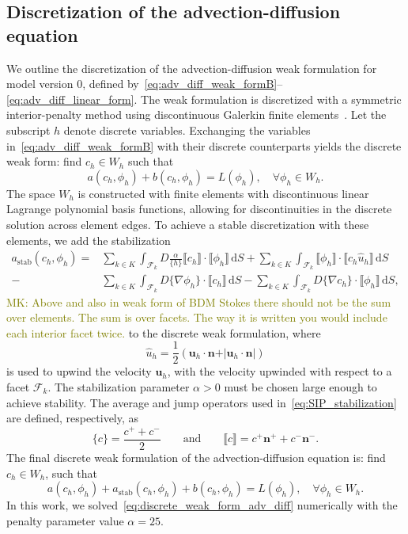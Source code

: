 \documentclass[fleqn]{wlscirep}
\newcommand{\intF}[1]{\int_{\mathcal{F}_k}#1 \, \mathrm dS}
\newcommand{\avg}[1]{\{#1\}}
\newcommand{\jump}[1]{\llbracket#1\rrbracket}
\newcommand{\nn}{\mathbf{n}}
\newcommand{\uu}{\mathbf{u}}
\newcommand{\mk}[1]{\textcolor{olive}{MK: #1}}
\begin{document}
\subsection{Discretization of the advection-diffusion equation}
We outline the discretization of the advection-diffusion weak formulation for model version 0, defined by~\eqref{eq:adv_diff_weak_formB}--\eqref{eq:adv_diff_linear_form}. The weak formulation is discretized with a symmetric interior-penalty method using discontinuous Galerkin finite elements~\cite{Arnold1982AnElements}. Let the subscript $h$ denote discrete variables. Exchanging the variables in~\eqref{eq:adv_diff_weak_formB} with their discrete counterparts yields the discrete weak form: find $c_h\in W_h$ such that
\begin{equation*}
    a(c_h, \phi_h) + b(c_h, \phi_h) = L(\phi_h), \quad\forall\phi_h\in W_h.
\end{equation*}
The space $W_h$ is constructed with  finite elements with discontinuous linear Lagrange polynomial basis functions, allowing for discontinuities in the discrete solution across element edges.  To achieve a stable discretization with these elements, we add the stabilization
\begin{equation}
    \begin{aligned}
        a_{\mathrm{stab}}(c_h, \phi_h) = &\sum_{k\in K}\intF{D\frac{\alpha}{\avg{h}}\jump{c_h}\cdot\jump{\phi_h}} +\sum_{k\in K}\intF{\jump{\phi_h}\cdot\jump{c_h \hat{u}_h}}  \\
         -&\sum_{k\in K}\intF{D\avg{\nabla\phi_h}\cdot\jump{c_h}} -\sum_{k\in K}\intF{D\avg{\nabla c_h}\cdot\jump{\phi_h}},
    \end{aligned}\label{eq:SIP_stabilization}
\end{equation}
\mk{
Above and also in weak form of BDM Stokes there should not be the sum over elements.
The sum is over facets. The way it is written you would include each interior facet twice.
}
to the discrete weak formulation, where
\begin{equation*}
    \hat{u}_h = \frac{1}{2}\left(\uu_h\cdot\nn + \vert\uu_h\cdot\nn\vert\right)
\end{equation*}
is used to upwind the velocity $\uu_h$, with the velocity upwinded with respect to a facet $\mathcal{F}_k$. The stabilization parameter $\alpha>0$ must be chosen large enough to achieve stability. The average and jump operators used in~\eqref{eq:SIP_stabilization} are defined, respectively, as
\begin{equation*}
    \avg{c} = \frac{c^+ + c^-}{2} \qquad\mathrm{and}\qquad \jump{c} = c^+\nn^+ + c^-\nn^-.
\end{equation*}
The final discrete weak formulation of the advection-diffusion equation is: find $c_h\in W_h$, such that
\begin{equation}
    a(c_h, \phi_h) + a_{\mathrm{stab}}(c_h, \phi_h) + b(c_h, \phi_h) = L(\phi_h), \quad\forall\phi_h\in W_h.
    \label{eq:discrete_weak_form_adv_diff}
\end{equation}
In this work, we solved~\eqref{eq:discrete_weak_form_adv_diff} numerically with the penalty parameter value $\alpha=25$.
\end{document}
